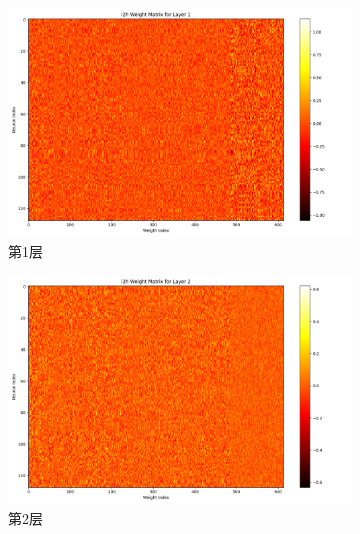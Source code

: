     \begin{figure}[H]
        \centering
        \begin{subfigure}{0.3\textwidth}
            \includegraphics[width=\linewidth]{../output/rnn/no scheduler/Weight Matrix for Layer 1.png}
            \caption{第1层}
            \label{fig:rnnweightmatrixforlayer1}
        \end{subfigure}
        \hfill
        \begin{subfigure}{0.3\textwidth}
            \includegraphics[width=\linewidth]{../output/rnn/no scheduler/Weight Matrix for Layer 2.png}
            \caption{第2层}
            \label{fig:rnnweightmatrixforlayer2}
        \end{subfigure}
        \hfill
        \begin{subfigure}{0.3\textwidth}

\end{subfigure}
\end{figure}
